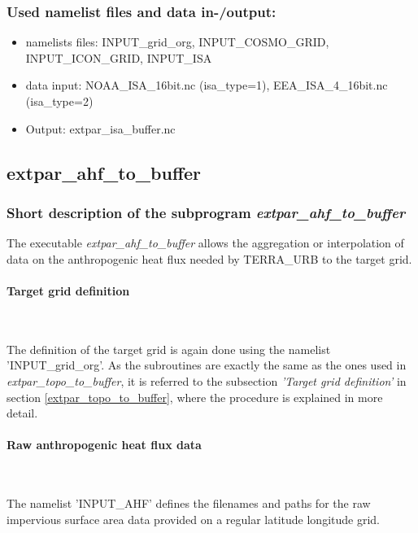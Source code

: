 \documentclass[a4paper,10pt,DIV14,BCOR1cm,titlepage,twoside]{scrartcl}
\begin{document}
\subsubsection{Used namelist files and data in-/output:}
\begin{itemize}
 \item namelists files: INPUT\_grid\_org, INPUT\_COSMO\_GRID, INPUT\_ICON\_GRID, INPUT\_ISA
 \item data input: NOAA\_ISA\_16bit.nc (isa\_type=1), EEA\_ISA\_4\_16bit.nc (isa\_type=2) 
 \item Output: extpar\_isa\_buffer.nc
\end{itemize}
\subsection{extpar\_ahf\_to\_buffer}\label{extpar_ahf_to_buffer}
\subsubsection{Short description of the subprogram \textit{extpar\_ahf\_to\_buffer}}
The executable \textit{extpar\_ahf\_to\_buffer} allows the aggregation or interpolation of data on the anthropogenic heat flux needed by TERRA\_URB to the target grid. \par\medskip\noindent
\paragraph{Target grid definition} \ \par\medskip\noindent
The definition of the target grid is again done using the namelist 'INPUT\_grid\_org'. As the subroutines are exactly the same as the ones used in \textit{extpar\_topo\_to\_buffer}, it is referred to the subsection \textit{'Target grid definition'} in section \ref{extpar_topo_to_buffer}, where the procedure is explained in more detail. \par\medskip\noindent
\paragraph{Raw anthropogenic heat flux data}\ \par\medskip\noindent
The namelist 'INPUT\_AHF' defines the filenames and paths for the raw impervious surface area data provided on a regular latitude longitude grid.\par\medskip\noindent
\end{document}
